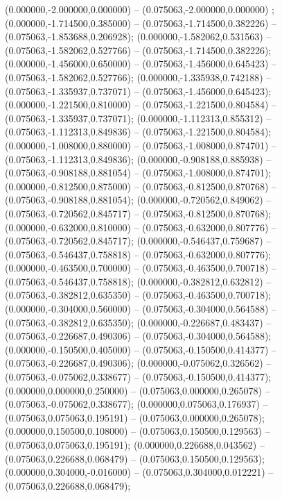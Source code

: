  (0.000000,-2.000000,0.000000) -- (0.075063,-2.000000,0.000000) ;
 (0.000000,-1.714500,0.385000) -- (0.075063,-1.714500,0.382226) -- (0.075063,-1.853688,0.206928);
 (0.000000,-1.582062,0.531563) -- (0.075063,-1.582062,0.527766) -- (0.075063,-1.714500,0.382226);
 (0.000000,-1.456000,0.650000) -- (0.075063,-1.456000,0.645423) -- (0.075063,-1.582062,0.527766);
 (0.000000,-1.335938,0.742188) -- (0.075063,-1.335937,0.737071) -- (0.075063,-1.456000,0.645423);
 (0.000000,-1.221500,0.810000) -- (0.075063,-1.221500,0.804584) -- (0.075063,-1.335937,0.737071);
 (0.000000,-1.112313,0.855312) -- (0.075063,-1.112313,0.849836) -- (0.075063,-1.221500,0.804584);
 (0.000000,-1.008000,0.880000) -- (0.075063,-1.008000,0.874701) -- (0.075063,-1.112313,0.849836);
 (0.000000,-0.908188,0.885938) -- (0.075063,-0.908188,0.881054) -- (0.075063,-1.008000,0.874701);
 (0.000000,-0.812500,0.875000) -- (0.075063,-0.812500,0.870768) -- (0.075063,-0.908188,0.881054);
 (0.000000,-0.720562,0.849062) -- (0.075063,-0.720562,0.845717) -- (0.075063,-0.812500,0.870768);
 (0.000000,-0.632000,0.810000) -- (0.075063,-0.632000,0.807776) -- (0.075063,-0.720562,0.845717);
 (0.000000,-0.546437,0.759687) -- (0.075063,-0.546437,0.758818) -- (0.075063,-0.632000,0.807776);
 (0.000000,-0.463500,0.700000) -- (0.075063,-0.463500,0.700718) -- (0.075063,-0.546437,0.758818);
 (0.000000,-0.382812,0.632812) -- (0.075063,-0.382812,0.635350) -- (0.075063,-0.463500,0.700718);
 (0.000000,-0.304000,0.560000) -- (0.075063,-0.304000,0.564588) -- (0.075063,-0.382812,0.635350);
 (0.000000,-0.226687,0.483437) -- (0.075063,-0.226687,0.490306) -- (0.075063,-0.304000,0.564588);
 (0.000000,-0.150500,0.405000) -- (0.075063,-0.150500,0.414377) -- (0.075063,-0.226687,0.490306);
 (0.000000,-0.075062,0.326562) -- (0.075063,-0.075062,0.338677) -- (0.075063,-0.150500,0.414377);
 (0.000000,0.000000,0.250000) -- (0.075063,0.000000,0.265078) -- (0.075063,-0.075062,0.338677);
 (0.000000,0.075063,0.176937) -- (0.075063,0.075063,0.195191) -- (0.075063,0.000000,0.265078);
 (0.000000,0.150500,0.108000) -- (0.075063,0.150500,0.129563) -- (0.075063,0.075063,0.195191);
 (0.000000,0.226688,0.043562) -- (0.075063,0.226688,0.068479) -- (0.075063,0.150500,0.129563);
 (0.000000,0.304000,-0.016000) -- (0.075063,0.304000,0.012221) -- (0.075063,0.226688,0.068479);

